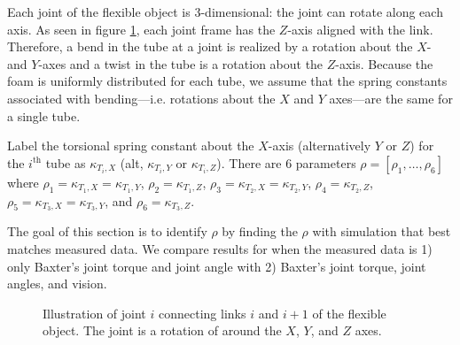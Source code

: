 \documentclass[runningheads,a4paper]{llncs}
\begin{document}
Each joint of the flexible object is 3-dimensional: the joint can rotate along each axis. As seen in figure \ref{fig-tube_link}, each joint frame has the $Z$-axis aligned with the link. Therefore, a bend in the tube at a joint is realized by a rotation about the $X$- and $Y$-axes and a twist in the tube is a rotation about the $Z$-axis. Because the foam is uniformly distributed for each tube, we assume that the spring constants associated with bending---i.e. rotations about the $X$ and $Y$ axes---are the same for a single tube. 

Label the torsional spring constant about the $X$-axis (alternatively $Y$ or $Z$) for the $i^{\textrm{th}}$ tube as $\kappa_{T_i,X}$ (alt, $\kappa_{T_i,Y}$ or $\kappa_{T_i,Z}$). There are 6 parameters $\rho = [\rho_1,\ldots,\rho_6]$ where $\rho_1 = \kappa_{T_1,X} = \kappa_{T_1,Y}$, $\rho_2 = \kappa_{T_1,Z}$, $\rho_3 = \kappa_{T_2,X} = \kappa_{T_2,Y}$, $\rho_4 = \kappa_{T_2,Z}$, $\rho_5 = \kappa_{T_3,X} = \kappa_{T_3,Y}$, and $\rho_6 = \kappa_{T_3,Z}$. 

The goal of this section is to identify $\rho$ by finding the $\rho$ with simulation that best matches measured data.  We compare results for when the measured data is 1) only Baxter's joint torque and joint angle with 2) Baxter's joint torque, joint angles, and vision.

\begin{figure}[!htb]
\centering
\def\svgwidth{.80\textwidth}%

\caption{Illustration of joint $i$ connecting links $i$ and $i+1$ of the flexible object.  The joint is a rotation of around the $X$, $Y$, and $Z$ axes.}
\label{fig-tube_link}
\end{figure}
\end{document}
